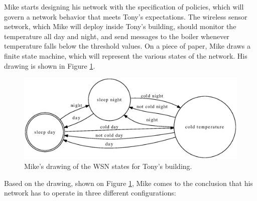 \documentclass[11pt]{article}
\begin{document}
Mike starts designing his network with the specification of policies, which
will govern a network behavior that meets Tony's expectations. The wireless
sensor network, which Mike will deploy inside Tony's building, should
monitor the temperature all day and night, and send messages to the
boiler whenever temperature falls below the threshold values. On a piece of
paper, Mike draws a finite state machine, which will represent the various 
states of the network. His drawing is shown in Figure \ref{fig:fsm}.

\begin{figure}[htp]
\centering
	\includegraphics[scale=0.6]{fig/fsm.eps}
	\caption{Mike's drawing of the WSN states for Tony's building.}
	\label{fig:fsm}
\end{figure}

Based on the drawing, shown on Figure \ref{fig:fsm}, Mike comes to the
conclusion that his network has to operate in three different
configurations:								\\
\end{document}
